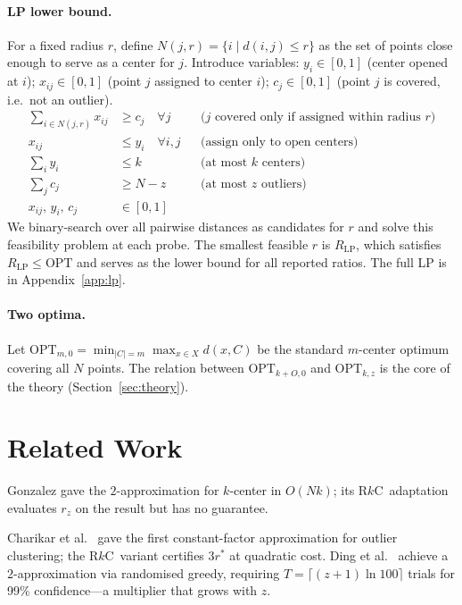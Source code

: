\documentclass[twoside,leqno,twocolumn]{article}
\newcommand{\OPT}{\mathrm{OPT}}
\newcommand{\rz}{r_z}
\newcommand{\rkc}{R$k$C}
\begin{document}
\paragraph{LP lower bound.}
For a fixed radius $r$, define $N(j,r)=\{i \mid d(i,j)\le r\}$ as the
set of points close enough to serve as a center for $j$.
Introduce variables: $y_i\in[0,1]$ (center opened at $i$);
$x_{ij}\in[0,1]$ (point $j$ assigned to center $i$);
$c_j\in[0,1]$ (point $j$ is covered, i.e.\ not an outlier).
\begin{align*}
\sum_{i\in N(j,r)} x_{ij} &\ge c_j \quad\forall j
  &&\text{($j$ covered only if assigned within radius $r$)}\\
x_{ij} &\le y_i \quad\forall i,j
  &&\text{(assign only to open centers)}\\
\sum_i y_i &\le k
  &&\text{(at most $k$ centers)}\\
\sum_j c_j &\ge N-z
  &&\text{(at most $z$ outliers)}\\
x_{ij},\,y_i,\,c_j &\in [0,1]
\end{align*}
We binary-search over all pairwise distances as candidates for $r$
and solve this feasibility problem at each probe. The smallest
feasible $r$ is $R_{\mathrm{LP}}$, which satisfies
$R_\mathrm{LP}\le\OPT$ and serves as the lower bound for all
reported ratios. The full LP is in Appendix~\ref{app:lp}.

\paragraph{Two optima.}
Let $\OPT_{m,0}=\min_{|C|=m}\max_{x\in X}d(x,C)$ be the standard
$m$-center optimum covering all $N$ points. The relation between
$\OPT_{k+O,0}$ and $\OPT_{k,z}$ is the core of the theory
(Section~\ref{sec:theory}).


\section{Related Work}

Gonzalez \cite{gonzalez1985} gave the $2$-approximation for $k$-center
in $O(Nk)$; its \rkc\ adaptation evaluates $\rz$ on the result but
has no guarantee.

Charikar et al.\ \cite{charikar2001} gave the first constant-factor
approximation for outlier clustering; the \rkc\ variant certifies
$3r^{*}$ at quadratic cost. Ding et al.\ \cite{ding2019} achieve a
$2$-approximation via randomised greedy, requiring
$T=\lceil(z{+}1)\ln100\rceil$ trials for 99\% confidence---a
multiplier that grows with $z$.
\end{document}
